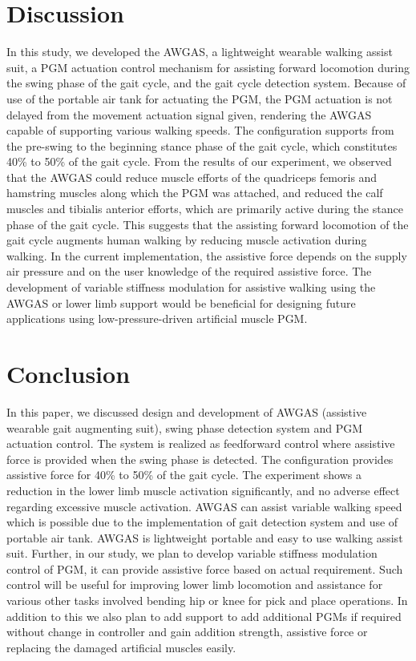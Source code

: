 \documentclass[paper,JRM,paper]{jaciiiarticle}
\begin{document}
\section{Discussion}
In this study, we developed the AWGAS, a lightweight wearable walking assist suit, a PGM actuation control mechanism for assisting forward locomotion during the swing phase of the gait cycle, and the gait cycle detection system. Because of use of the portable air tank for actuating the PGM, the PGM actuation is not delayed from the movement actuation signal given, rendering the AWGAS capable of supporting various walking speeds. The configuration supports from the pre-swing to the beginning stance phase of the gait cycle, which constitutes 40\% to 50\% of the gait cycle. From the results of our experiment, we observed that the AWGAS could reduce muscle efforts of the quadriceps femoris and hamstring muscles along which the PGM was attached, and reduced the calf muscles and tibialis anterior efforts, which are primarily active during the stance phase of the gait cycle. This suggests that the assisting forward locomotion of the gait cycle augments human walking by reducing muscle activation during walking. In the current implementation, the assistive force depends on the supply air pressure and on the user knowledge of the required assistive force. The development of variable stiffness modulation for assistive walking using the AWGAS or lower limb support would be beneficial for designing future applications using low-pressure-driven artificial muscle PGM.  

\section{Conclusion}

In this paper, we discussed design and development of AWGAS (assistive wearable gait augmenting suit), swing phase detection system and PGM actuation control. The system is realized as feedforward control where assistive force is provided when the swing phase is detected. The configuration provides assistive force for 40\% to 50\% of the gait cycle. The experiment shows a reduction in the lower limb muscle activation significantly, and no adverse effect regarding excessive muscle activation. AWGAS can assist variable walking speed which is possible due to the implementation of gait detection system and use of portable air tank. AWGAS is lightweight portable and easy to use walking assist suit. Further, in our study, we plan to develop variable stiffness modulation control of PGM, it can provide assistive force based on actual requirement. Such control will be useful for improving lower limb locomotion and assistance for various other tasks involved bending hip or knee for pick and place operations. In addition to this we also plan to add support to add additional PGMs if required without change in controller and gain addition strength, assistive force or replacing the damaged artificial muscles easily. 
\end{document}
